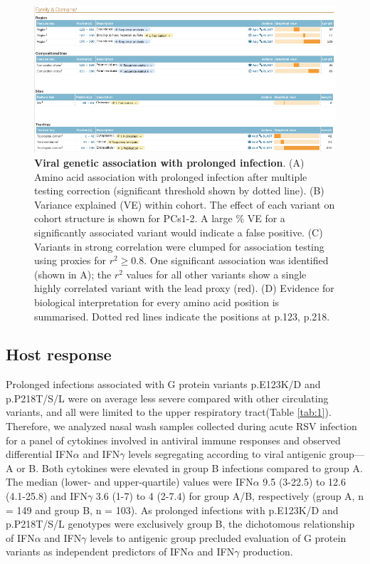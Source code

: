 \documentclass{article} %
\begin{document}
\begin{figure}[ht] \hspace{-0.5cm} 
    \includegraphics[scale=0.8]{f4}
	\caption{\textbf{Viral genetic association with prolonged infection}. (A) Amino acid association with prolonged infection after multiple testing correction (significant threshold shown by dotted line). (B) Variance explained (VE) within cohort. The effect of each variant on cohort structure is shown for PCs1-2. A large \% VE for a significantly associated variant would indicate a false positive. (C) Variants in strong correlation were clumped for association testing using proxies for $r^2 \ge 0.8$. One significant association was identified (shown in A); the $r^2$ values for all other variants show a single highly correlated variant with the lead proxy (red). 
	(D) Evidence for biological interpretation for every amino acid position is summarised. Dotted red lines indicate the positions at p.123, p.218.}
	\label{fig:3}
\end{figure}
\clearpage

\subsection{Host response}
Prolonged infections associated with G protein variants p.E123K/D and p.P218T/S/L were on average less severe compared with other circulating variants, and all were limited to the upper respiratory tract(Table \ref{tab:1}). 
Therefore, we analyzed nasal wash samples collected during acute RSV infection for a panel of cytokines involved in antiviral immune responses and observed differential IFN$\alpha$ and IFN$\gamma$ levels segregating according to viral antigenic group—A or B.
Both cytokines were elevated in group B infections compared to group A.
The median (lower- and upper-quartile) values were
IFN$\alpha$ 9.5 (3-22.5) to 12.6 (4.1-25.8) and 
IFN$\gamma$ 3.6 (1-7) to 4 (2-7.4) for group A/B, respectively (group A, n = 149 and group B, n = 103).
As prolonged infections with p.E123K/D and p.P218T/S/L genotypes were exclusively group B, 
the dichotomous relationship of IFN$\alpha$ and IFN$\gamma$ levels to antigenic group precluded evaluation of G protein variants as independent predictors of IFN$\alpha$ and IFN$\gamma$ production. 
\end{document}
